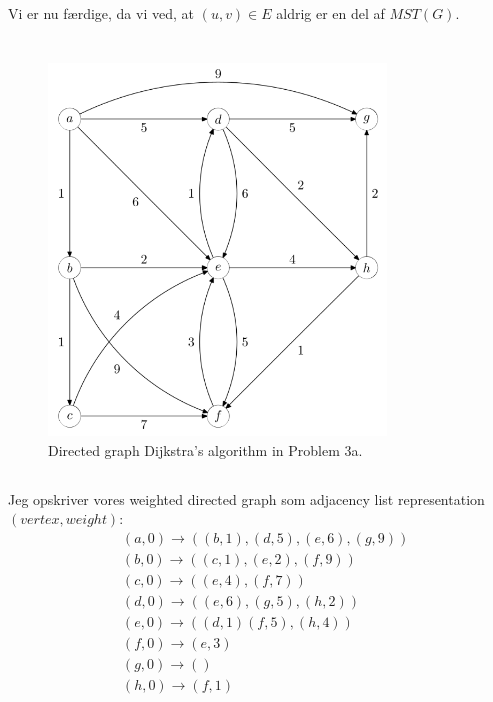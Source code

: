 \documentclass[a4paper,12pt]{article}
\begin{document}
Vi er nu færdige, da vi ved, at $(u,v)\in E$ aldrig er en del af $MST(G)$.

\subsection[]{}




\section[Question 3]{}
\begin{figure}[H]
    \centering
    \includegraphics[width=0.8\textwidth]{3.png}
    \caption{Directed graph Dijkstra's algorithm in Problem 3a.}
\end{figure}
\subsection[]{}

Jeg opskriver vores weighted directed graph som adjacency list representation $(vertex, weight)$:
\[
\begin{aligned}
&(a,0) \rightarrow ((b,1), (d,5), (e,6), (g,9))\\
&(b,0) \rightarrow ((c,1), (e,2), (f,9))\\
&(c,0) \rightarrow ((e,4), (f,7))\\
&(d,0) \rightarrow ((e,6), (g,5), (h,2))\\
&(e,0) \rightarrow ((d,1)(f,5), (h,4))\\
&(f,0) \rightarrow (e,3)\\
&(g,0) \rightarrow ()\\
&(h,0) \rightarrow (f,1)\\
\end{aligned}
\]
\end{document}
